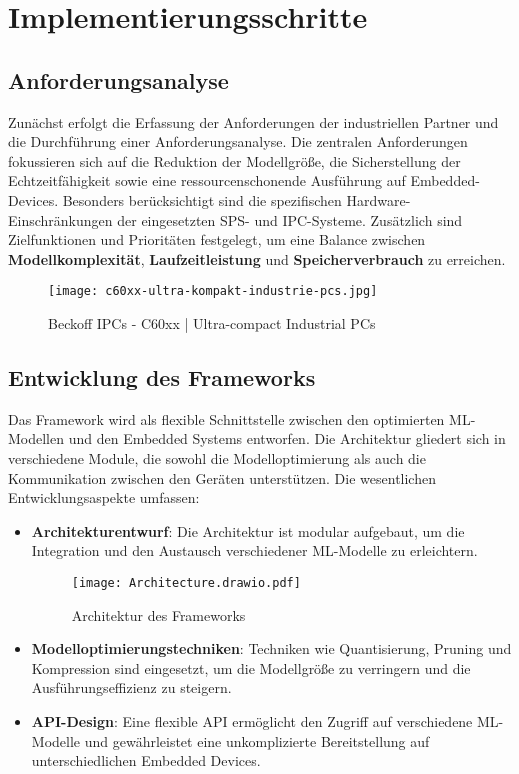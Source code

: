 \section{Implementierungsschritte}

\subsection{Anforderungsanalyse}
Zunächst erfolgt die Erfassung der Anforderungen der industriellen Partner und die Durchführung einer Anforderungsanalyse. Die zentralen Anforderungen fokussieren sich 
auf die Reduktion der Modellgröße, die Sicherstellung der Echtzeitfähigkeit sowie eine ressourcenschonende Ausführung auf Embedded-Devices. Besonders berücksichtigt sind die 
spezifischen Hardware-Einschränkungen der eingesetzten SPS- und IPC-Systeme. Zusätzlich sind Zielfunktionen und Prioritäten festgelegt, um eine Balance zwischen \textbf{Modellkomplexität}, 
\textbf{Laufzeitleistung} und \textbf{Speicherverbrauch} zu erreichen.


\begin{figure}[h!]
    \centering
    \texttt{[image: c60xx-ultra-kompakt-industrie-pcs.jpg]} 
    \caption{Beckoff IPCs - C60xx | Ultra-compact Industrial PCs\cite{BeckhoffWebsite}} 
    \label{fig:beckoffipc} %
\end{figure}


\subsection{Entwicklung des Frameworks}
Das Framework wird als flexible Schnittstelle zwischen den optimierten ML-Modellen und den Embedded Systems entworfen. Die Architektur gliedert sich in verschiedene Module, 
die sowohl die Modelloptimierung als auch die Kommunikation zwischen den Geräten unterstützen. Die wesentlichen Entwicklungsaspekte umfassen:

\begin{itemize}
    \item \textbf{Architekturentwurf}: Die Architektur ist modular aufgebaut, um die Integration und den Austausch verschiedener ML-Modelle zu erleichtern.
    
    \begin{figure}[h!]
        \centering
        \texttt{[image: Architecture.drawio.pdf]} 
        \caption{Architektur des Frameworks} 
        \label{fig:architecture}
    \end{figure}

    \item \textbf{Modelloptimierungstechniken}: Techniken wie Quantisierung, Pruning und Kompression sind eingesetzt, um die Modellgröße zu verringern und die 
    Ausführungseffizienz zu steigern.
    \item \textbf{API-Design}: Eine flexible API ermöglicht den Zugriff auf verschiedene ML-Modelle und gewährleistet eine unkomplizierte Bereitstellung auf unterschiedlichen 
    Embedded Devices.
\end{itemize}


